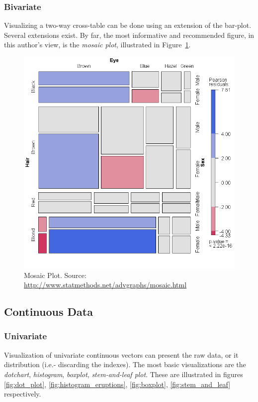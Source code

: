 \documentclass[12pt,a4paper]{report}
\begin{document}
\subsubsection{Bivariate}
Visualizing a two-way cross-table can be done using an extension of the bar-plot.
Several extensions exist. By far, the most informative and recommended figure, in this author's view, is the \emph{mosaic plot}, illustrated in Figure~\ref{fig:mosaic}. 

\begin{figure}
\centering
\includegraphics[width=0.7\linewidth]{art/mosaic1}
\caption[Mosaic Plot]{Mosaic Plot. Source: \url{http://www.statmethods.net/advgraphs/mosaic.html}}
\label{fig:mosaic}
\end{figure}



\subsection{Continuous Data}




\subsubsection{Univariate}
Visualization of univariate continuous vectors can present the raw data, or it distribution (i.e.- discarding the indexes).
The most basic visualizations are the \emph{dotchart}, \emph{histogram}, \emph{boxplot}, \emph{stem-and-leaf plot}. 
These are illustrated in figures \ref{fig:dot_plot}, \ref{fig:histogram_eruptions}, \ref{fig:boxplot}, \ref{fig:stem_and_leaf} respectively. 
\end{document}
